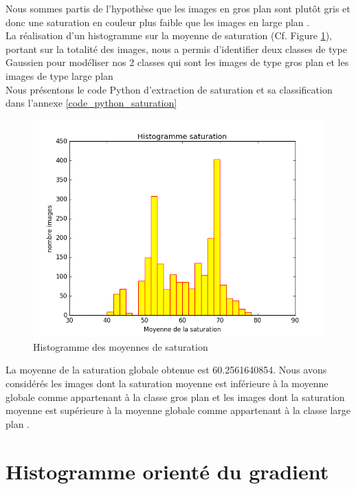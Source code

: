 \documentclass{book}
\begin{document}
Nous sommes partis de l’hypothèse que les images en \og gros plan \fg{} sont plutôt gris et donc une saturation en couleur plus faible que les images en \og large plan \fg{}.\\
La réalisation d’un histogramme sur la moyenne de saturation (Cf. Figure \ref{hue_histo}), portant sur la totalité des images, nous a permis d’identifier deux classes de type Gaussien pour modéliser nos 2 classes
qui sont les images de type \og gros plan \fg{} et les images de type \og large plan \fg{}\\
Nous présentons le code Python d'extraction de saturation et sa classification dans l'annexe \ref{code_python_saturation}
\label{hue_frontiere}
\begin{figure}[H]
\begin{center}
\includegraphics[scale=0.5]{hue_histogramme.jpg}
\end{center}
\caption{Histogramme des moyennes de saturation}
\label{hue_histo}
\end{figure}

La moyenne de la saturation globale obtenue est 60.2561640854. 
Nous avons considérés les images dont la saturation moyenne est inférieure à la moyenne globale comme appartenant à la classe \og gros plan \fg{} et les images dont 
la saturation moyenne est supérieure à la moyenne globale comme appartenant à la classe \og large plan \fg{}.

\section{Histogramme orienté du gradient}
\end{document}

